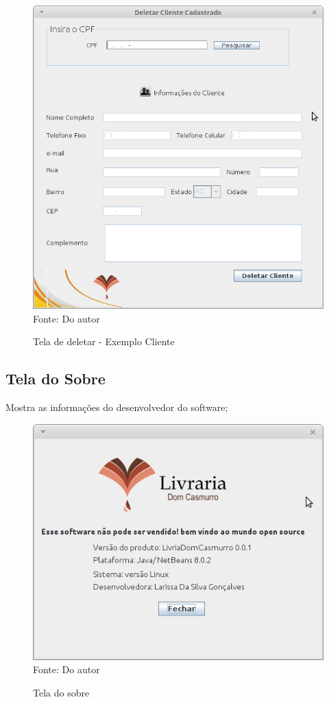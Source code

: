 \begin{figure}[H]
	\centering 
	\caption{Tela de deletar - Exemplo Cliente}
	\label{Deletar_cliente}
	\includegraphics[scale = 0.6]{imagens/tela-deletar-cliente.png}
	\\Fonte: Do autor
\end{figure}


\subsection{Tela do Sobre}

Mostra as informações do desenvolvedor do software;

\begin{figure}[H]
	\centering 
	\caption{Tela do sobre}
	\label{sobre}
	\includegraphics[scale = 0.6]{imagens/tela-sobre.png}
	\\Fonte: Do autor
\end{figure}

